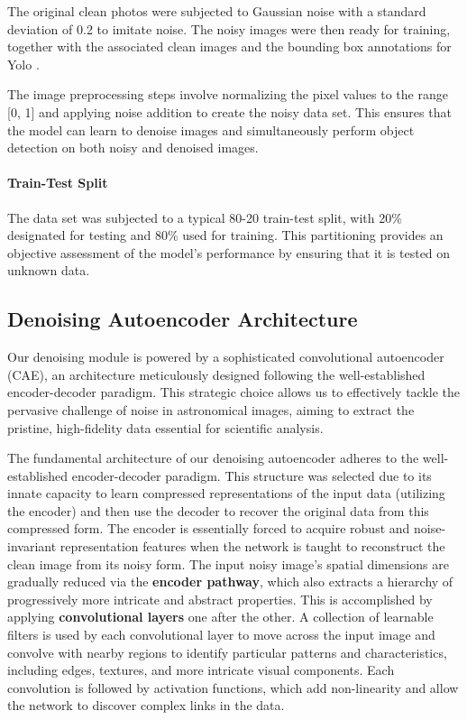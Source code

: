 \documentclass[12pt, conference]{IEEEtran}
\begin{document}
The original clean photos were subjected to Gaussian noise with a standard deviation of 0.2 to imitate noise. The noisy images were then ready for training, together with the associated clean images and the bounding box annotations for Yolo \cite{redmon2016you}.

The image preprocessing steps involve normalizing the pixel values to the range [0, 1] and applying noise addition to create the noisy data set. This ensures that the model can learn to denoise images and simultaneously perform object detection on both noisy and denoised images.
\paragraph{Train-Test Split}
The data set was subjected to a typical 80-20 train-test split, with 20\% designated for testing and 80\% used for training. This partitioning provides an objective assessment of the model's performance by ensuring that it is tested on unknown data.

\subsection{Denoising Autoencoder Architecture}
Our denoising module is powered by a sophisticated convolutional autoencoder (CAE), an architecture meticulously designed following the well-established encoder-decoder paradigm. This strategic choice allows us to effectively tackle the pervasive challenge of noise in astronomical images, aiming to extract the pristine, high-fidelity data essential for scientific analysis.

The fundamental architecture of our denoising autoencoder adheres to the well-established encoder-decoder paradigm. This structure was selected due to its innate capacity to learn compressed representations of the input data (utilizing the encoder) and then use the decoder to recover the original data from this compressed form. The encoder is essentially forced to acquire robust and noise-invariant representation \cite{hinton2006reducing} features when the network is taught to reconstruct the clean image from its noisy form.
\newline
The input noisy image's spatial dimensions are gradually reduced via the \textbf{encoder pathway}, which also extracts a hierarchy of progressively more intricate and abstract properties. This is accomplished by applying \textbf{convolutional layers} one after the other. A collection of learnable filters is used by each convolutional layer to move across the input image and convolve with nearby regions to identify particular patterns and characteristics, including edges, textures, and more intricate visual components. Each convolution is followed by activation functions, which add non-linearity and allow the network to discover complex links in the data.
\end{document}
